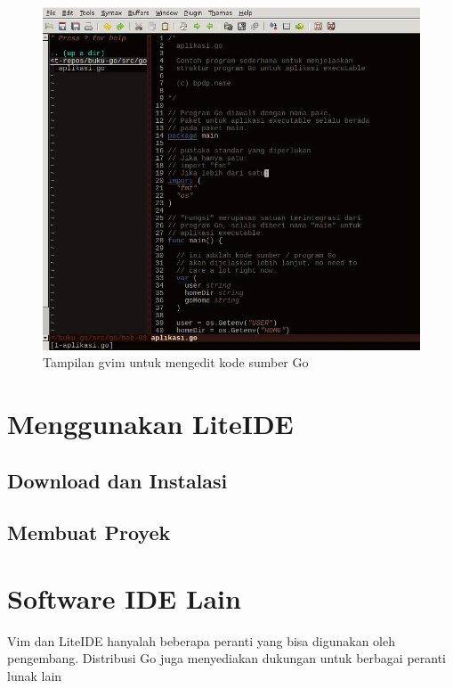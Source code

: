   \begin{figure}
    \begin{center}
      \includegraphics[scale=0.5]{images/vim-go.jpg}
    \end{center}
    \caption{Tampilan gvim untuk mengedit kode sumber Go}
    \label{fig:vim-go}
  \end{figure}

\section{Menggunakan LiteIDE}

\subsection{Download dan Instalasi}


\subsection{Membuat Proyek}


\section{Software IDE Lain}

Vim dan LiteIDE hanyalah beberapa peranti yang bisa digunakan oleh pengembang. Distribusi Go juga menyediakan dukungan untuk berbagai peranti lunak lain
